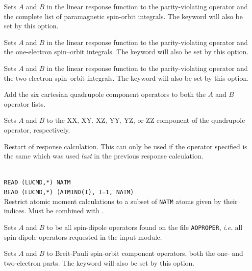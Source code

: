 \begin{description}
\item{} Sets $A$ and $B$ in the linear response function
  to the parity-violating operator and the complete list of
  paramagnetic spin-orbit integrals. The  keyword will
  also be set by this option.

\item{} Sets $A$ and $B$ in the linear response function
  to the parity-violating operator and the one-electron spin--orbit
  integrals. The  keyword will
  also be set by this option.

\item{} Sets $A$ and $B$ in the linear response function
  to the parity-violating operator and the two-electron spin--orbit
  integrals. The  keyword will
  also be set by this option.

\item{}
Add the six cartesian quadrupole component operators
to both the $A$ and $B$ operator lists.

\item{}
Sets $A$ and $B$ to the XX, XY, XZ, YY, YZ, or ZZ component of the
quadrupole operator, respectively.

\item{}
Restart of response calculation. This
can only be used if the
operator specified is the same which was used \textit{last} in the previous
response calculation.

\item{}\\
\verb|READ (LUCMD,*) NATM|\\
\verb|READ (LUCMD,*) (ATMIND(I), I=1, NATM)|\\
Restrict atomic moment calculations to a subset of \verb|NATM| atoms given by their indices. Must be combined with .

\item{} Sets $A$ and $B$ to be all spin-dipole operators
  found on the file \verb|AOPROPER|, {\it i.e.\/} all spin-dipole
  operators requested in the  input module.

\item{}
Sets $A$ and $B$ to Breit-Pauli spin-orbit component operators,
both the one- and two-electron parts. 
The  keyword will also be set by this option.


\end{description}
